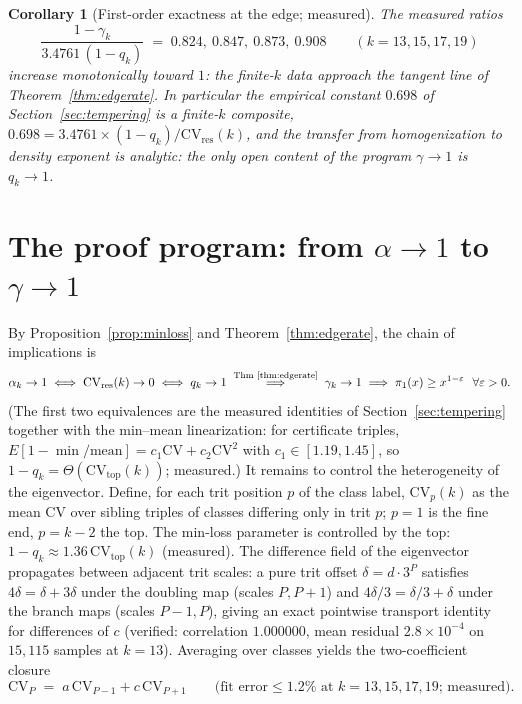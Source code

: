 \documentclass[11pt]{article}
\newtheorem{corollary}[theorem]{Corollary}
\theoremstyle{definition}
\theoremstyle{remark}
\newcommand{\CV}{\mathrm{CV}}
\newcommand{\gam}{\gamma}
\begin{document}
\begin{corollary}[First-order exactness at the edge; measured]\label{cor:ratios}
The measured ratios
\[
\frac{1 - \gam_k}{3.4761\,(1 - q_k)} \;=\; 0.824,\ 0.847,\ 0.873,\ 0.908
\qquad (k = 13, 15, 17, 19)
\]
increase monotonically toward $1$: the finite-$k$ data approach the tangent
line of Theorem~\ref{thm:edgerate}. In particular the empirical constant
$0.698$ of Section~\ref{sec:tempering} is a finite-$k$ composite,
$0.698 = 3.4761 \times (1 - q_k)/\CV_{\mathrm{res}}(k)$, and the transfer from
homogenization to density exponent is \emph{analytic}: the only open content of
the program $\gam \to 1$ is $q_k \to 1$.
\end{corollary}

\section{The proof program: from $\alpha \to 1$ to $\gam \to 1$}
\label{sec:program}

By Proposition~\ref{prop:minloss} and Theorem~\ref{thm:edgerate}, the chain of
implications is
\begin{equation}
\alpha_k \to 1
\;\Longleftrightarrow\;
\CV_{\mathrm{res}}(k) \to 0
\;\Longleftrightarrow\;
q_k \to 1
\;\overset{\text{Thm \ref{thm:edgerate}}}{\Longrightarrow}\;
\gam_k \to 1
\;\Longrightarrow\;
\pi_1(x) \geq x^{1 - \varepsilon} \ \ \forall \varepsilon > 0 .
\label{eq:chain}
\end{equation}
(The first two equivalences are the measured identities of
Section~\ref{sec:tempering} together with the min--mean linearization: for
certificate triples, $E[1 - \min/\mathrm{mean}] = c_1 \CV + c_2 \CV^2$ with
$c_1 \in [1.19, 1.45]$, so $1 - q_k = \Theta(\CV_{\mathrm{top}}(k))$;
measured.) It remains to control the heterogeneity of the eigenvector. Define,
for each trit position $p$ of the class label, $\CV_p(k)$ as the mean $\CV$
over sibling triples of classes differing only in trit $p$; $p = 1$ is the fine
end, $p = k - 2$ the top. The min-loss parameter is controlled by the top:
$1 - q_k \approx 1.36\, \CV_{\mathrm{top}}(k)$ (measured). The difference field
of the eigenvector propagates between adjacent trit scales: a pure trit offset
$\delta = d \cdot 3^P$ satisfies $4\delta = \delta + 3\delta$ under the
doubling map (scales $P, P{+}1$) and $4\delta/3 = \delta/3 + \delta$ under the
branch maps (scales $P{-}1, P$), giving an exact pointwise transport identity
for differences of $c$ (verified: correlation $1.000000$, mean residual
$2.8 \times 10^{-4}$ on $15{,}115$ samples at $k = 13$). Averaging over classes
yields the two-coefficient closure
\begin{equation}
\CV_P \;=\; a\, \CV_{P-1} + c\, \CV_{P+1}
\qquad \text{(fit error} \leq 1.2\% \text{ at } k = 13, 15, 17, 19\text{; measured)}.
\label{eq:lattice}
\end{equation}
\end{document}
